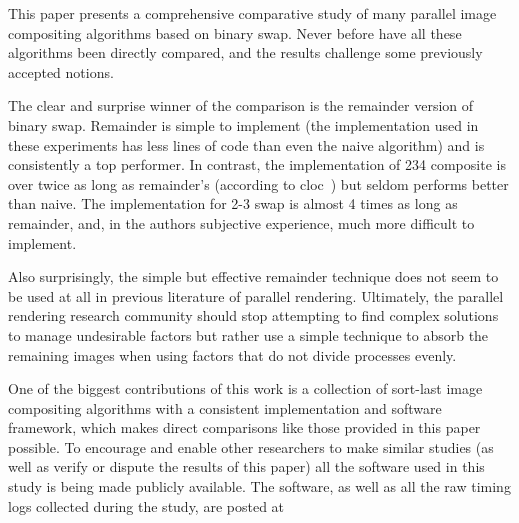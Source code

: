 \documentclass{vgtc}                          %
\newcommand*{\lcite}[1]{~\cite{#1}}
\newcommand*{\redact}[1]{\textsc{[#1]}}
\newcommand*{\textalgorithm}[1]{\textsf{#1}\xspace}
\newcommand{\binaryswap}{\textalgorithm{binary swap}}
\newcommand{\ttswap}{\textalgorithm{2-3 swap}}
\newcommand{\naive}{\textalgorithm{naive}}
\newcommand{\remainder}{\textalgorithm{remainder}}
\newcommand{\Remainder}{\textalgorithm{Remainder}}
\newcommand{\ttfcomposite}{\textalgorithm{234 composite}}
\begin{document}
This paper presents a comprehensive comparative study of many parallel image compositing algorithms based on \binaryswap.
Never before have all these algorithms been directly compared, and the results challenge some previously accepted notions.

The clear and surprise winner of the comparison is the \remainder version of binary swap.
\Remainder is simple to implement (the implementation used in these experiments has less lines of code than even the \naive algorithm) and is consistently a top performer.
In contrast, the implementation of \ttfcomposite is over twice as long as \remainder's (according to cloc\lcite{cloc}) but seldom performs better than \naive.
The implementation for \ttswap is almost 4 times as long as \remainder, and, in the authors subjective experience, much more difficult to implement.

Also surprisingly, the simple but effective \remainder technique does not seem to be used at all in previous literature of parallel rendering.
Ultimately, the parallel rendering research community should stop attempting to find complex solutions to manage undesirable factors but rather use a simple technique to absorb the remaining images when using factors that do not divide processes evenly.

One of the biggest contributions of this work is a collection of sort-last image compositing algorithms with a consistent implementation and software framework, which makes direct comparisons like those provided in this paper possible.
To encourage and enable other researchers to make similar studies (as well as verify or dispute the results of this paper) all the software used in this study is being made publicly available.
The software, as well as all the raw timing logs collected during the study, are posted at
\vfill %
\iftoggle{anonymous}{
  \redact{URL hidden for anonymous review.}
}{
  \noindent
  \begin{minipage}{\linewidth}
    \centering
    \small
    \url{http://www.kennethmoreland.com/scalable-rendering/\#LDAV2018}
  \end{minipage}
}
\end{document}
